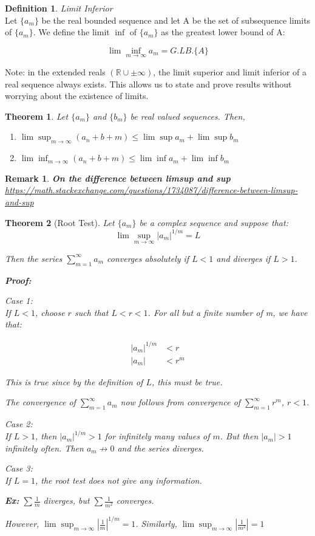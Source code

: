 \documentclass{article}
\newtheorem{theorem}{Theorem}[section]
\newtheorem*{remark}{Remark}
\theoremstyle{definition}
\newtheorem{definition}{Definition}[section]
\newcommand{\Def}[2]{
\begin{shaded*}
\begin{definition}{\textit{#1}}\\#2\end{definition}
\end{shaded*}
}
\def\R{\mathbb{R}}
\begin{document}
\Def{Limit Inferior}{Let $\{a_m\}$ be the real bounded sequence and let A be the set of subsequence limits of $\{a_m\}$. We define the limit $\inf$ of $\{a_m\}$ as the greatest lower bound of A:
	
	$$\lim\inf_{m \to \infty }a_m = G.LB.\{A\}$$
}

Note: in the extended reals $(\R \cup \pm \infty)$, the limit superior and limit inferior of a real sequence always exists. This allows us to state and prove results without worrying about the existence of limits.

\begin{theorem}
Let $\{a_m\}$ and $\{b_m\}$ be real valued sequences. Then, 
\begin{enumerate}
	\item $\lim \sup_{m \to \infty }(a_n + b+m) \leq \lim\sup a_m + \lim\sup b_m$
	\item $\lim \inf_{m \to \infty }(a_n + b+m) \leq \lim\inf a_m + \lim\inf b_m$
\end{enumerate}
\end{theorem}

\begin{remark}
\textbf{On the difference between limsup and sup}
\url{https://math.stackexchange.com/questions/1734087/difference-between-limsup-and-sup}

\end{remark}

\begin{theorem}[Root Test]
Let $\{a_m\}$ be a complex sequence and suppose that:
$$\lim\sup_{m \to \infty } |a_m|^{1/m} = L$$

Then the series $\sum_{m=1}^\infty a_m$ converges absolutely if $L<1$ and diverges if $L>1$. 

\textbf{Proof:}

Case 1: \\ 
If $L<1$, choose $r$ such that $L<r<1$. For all but a finite number of m, we have that:

\begin{align}
|a_m|^{1/m} & < r \\ 
|a_m|&  < r^m  
\end{align}

This is true since by the definition of $L$, this must be true. 

The convergence of $\sum_{m=1}^\infty a_m$ now follows from convergence of $\sum_{m=1}^\infty r^m$, $r<1$.

Case 2:\\
If $L>1$, then $|a_m|^{1/m} >1$ for infinitely many values of $m$. But then $|a_m|>1$ infinitely often. Then $a_m \not \to 0$ and the series diverges. 

Case 3: \\ 
If $L=1$, the root test does not give any information.

\textbf{Ex:} $\sum \frac{1}{m}$ diverges, but $\sum \frac{1}{m^2}$ converges.

 However, $\lim\sup_{m \to \infty }|\frac{1}{m}|^{1/m} = 1$. Similarly, $\lim\sup_{m \to \infty }|\frac{1}{m^2}| = 1$

\end{theorem}
\end{document}
